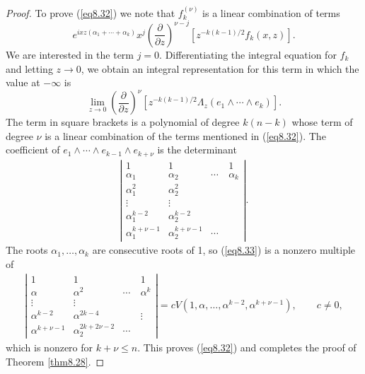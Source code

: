 \documentclass{surv-l}
\theoremstyle{plain}
\theoremstyle{definition}
\numberwithin{equation}{chapter}
\begin{document}
\begin{proof}
To prove (\ref{eq8.32}) we note that $f_{k}^{(\nu)}$ is a linear combination of terms
\begin{equation*}
e^{ixz(\alpha_{1}+\cdots +\alpha_{k})}{x^{j}}\left(\frac{\partial}{\partial z}\right)^{\nu-j}[z^{-k(k-1)/2}f_{k}(x, z)].
\end{equation*}
We are interested in the term $j=0$. Differentiating the integral equation for $f_{k}$ and letting $z\rightarrow 0$, we obtain an integral representation for this term in which the value at $-\infty$ is
\begin{equation*}
\lim_{z\rightarrow 0}\left(\frac{\partial}{\partial z}\right)^{\nu}[z^{-k(k-1)/2}\Lambda_{z}(e_{1}\wedge\cdots\wedge e_{k})].
\end{equation*}
The term in square brackets is a polynomial of degree $k(n-k)$ whose term of degree $\nu$ is a linear combination of the terms mentioned in (\ref{eq8.32}). The coefficient
of $e_{1}\wedge\cdots\wedge e_{k-1}\wedge e_{k+\nu}$ is the determinant
\begin{align}\label{eq8.33}
\left|\begin{array}{cccc}
        1 & 1 & \quad & 1 \\
        \alpha_{1} & \alpha_{2} & \cdots & \alpha_{k} \\
        \alpha_{1}^{2}& \alpha_{2}^{2} & \quad & \quad \\
        \vdots & \vdots & \quad & \quad \\
        \alpha_{1}^{k-2} & \alpha_{2}^{k-2} & \quad & \quad\\
        \alpha_{1}^{k+\nu-1} & \alpha_{2}^{k+\nu-1} & \cdots & \quad\end{array}\right|.
      \end{align}
The roots $\alpha_{1},\ldots, \alpha_{k}$ are consecutive roots of 1, so (\ref{eq8.33}) is a nonzero multiple of
\begin{align*}
\left|\begin{array}{cccc}
      1 & 1 & \quad & 1 \\
      \alpha & \alpha^{2} & \cdots & \alpha^{k}\\
      \vdots & \vdots & \quad & \quad\\
      \alpha^{k-2} & \alpha^{2k-4} & \quad & \vdots\\
      \alpha^{k+\nu-1} & \alpha_{2}^{2k+2\nu-2} & \cdots & \quad
    \end{array}\right|= cV(1,\alpha,\ldots,\alpha^{k-2},\alpha^{k+\nu-1}),\qquad c\neq 0,
    \end{align*}
    which is nonzero for $k+\nu\leq n$. This proves (\ref{eq8.32}) and completes the proof of Theorem \ref{thm8.28}.
\end{proof}
\end{document}
